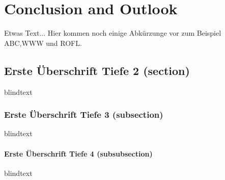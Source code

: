 \chapter{Conclusion and Outlook}
Etwas Text... Hier kommen noch einige Abkürzunge vor zum Beispiel \ac{ABC},\ac{WWW} und \ac{ROFL}.

\section{Erste Überschrift Tiefe 2 (section)}
blindtext

\subsection{Erste Überschrift Tiefe 3 (subsection)}
blindtext

\subsubsection{Erste Überschrift Tiefe 4 (subsubsection)}
blindtext
